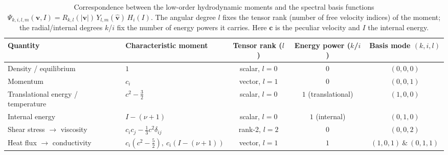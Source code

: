 \begin{table}[htbp]
  \centering
  \caption{Correspondence between the low-order hydrodynamic moments and the
    spectral basis functions $\Psi_{k,i,l,m}(\mathbf{v},I)
    = R_{k,l}(|\mathbf{v}|)\,Y_{l,m}(\hat{\mathbf{v}})\,H_i(I)$.
    The angular degree $l$ fixes the tensor rank (number of free velocity
    indices) of the moment; the radial/internal degrees $k$/$i$ fix the number
    of energy powers it carries. Here $\mathbf{c}$ is the peculiar velocity and
    $I$ the internal energy.}
  \label{tab:hydrodynamic_quantities}
  \begin{tabular}{@{}llccc@{}}
    \toprule
    Quantity & Characteristic moment & Tensor rank ($l$) & Energy power ($k$/$i$) & Basis mode $(k,i,l)$ \\
    \midrule
    Density / equilibrium               & $1$                                                   & scalar, $l=0$ & $0$                 & $(0,0,0)$ \\
    Momentum                            & $c_i$                                                 & vector, $l=1$ & $0$                 & $(0,0,1)$ \\
    Translational energy / temperature  & $c^2 - \tfrac{3}{2}$                                  & scalar, $l=0$ & $1$ (translational) & $(1,0,0)$ \\
    Internal energy                     & $I - (\nu+1)$                                         & scalar, $l=0$ & $1$ (internal)      & $(0,1,0)$ \\
    Shear stress $\to$ viscosity        & $c_i c_j - \tfrac{1}{3}c^2\delta_{ij}$                & rank-2, $l=2$ & $0$                 & $(0,0,2)$ \\
    Heat flux $\to$ conductivity        & $c_i\!\left(c^2 - \tfrac{5}{2}\right),\ c_i\!\left(I - (\nu+1)\right)$ & vector, $l=1$ & $1$ & $(1,0,1)\ \&\ (0,1,1)$ \\
    \bottomrule
  \end{tabular}
\end{table}
